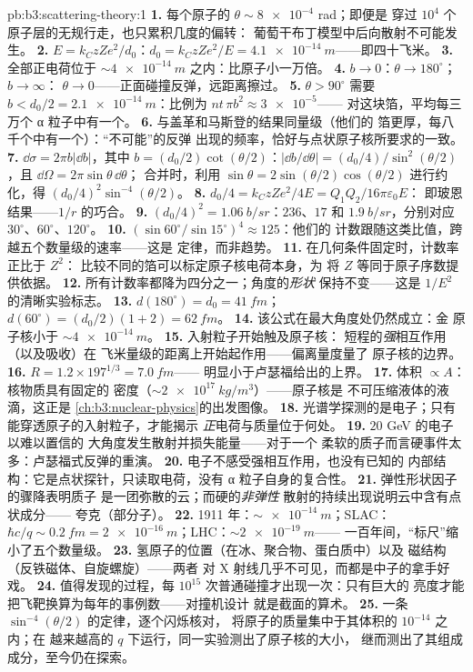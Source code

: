 \begin{solution}{pb:b3:scattering-theory:1}
\textbf{1.} 每个原子的 $\theta \sim \num{8e-4}$ rad；即便是
穿过 $10^4$ 个原子层的无规行走，也只累积几度的偏转：
葡萄干布丁模型中后向散射不可能发生。
\textbf{2.} $E = k_CzZe^2/d_0$：$d_0 = k_CzZe^2/E =
\qty{4.1e-14}{m}$——即四十飞米。
\textbf{3.} 全部正电荷位于
$\sim\qty{4e-14}{m}$ 之内：比原子小一万倍。
\textbf{4.} $b \to 0$：$\theta \to 180^\circ$；$b \to \infty$：
$\theta \to 0$——正面碰撞反弹，远距离擦过。
\textbf{5.} $\theta > 90^\circ$ 需要 $b < d_0/2 =
\qty{2.1e-14}{m}$：比例为 $nt\,\pi b^2 \approx \num{3e-5}$——
对这块箔，平均每三万个 α 粒子中有一个。
\textbf{6.} 与盖革和马斯登的结果同量级（他们的
箔更厚，每八千个中有一个）：“不可能”的反弹
出现的频率，恰好与点状原子核所要求的一致。
\textbf{7.} $\dd\sigma = 2\pi b|\dd b|$，其中 $b =
(d_0/2)\cot(\theta/2)$：$|\dd b/\dd\theta| = (d_0/4)/\sin^2(
\theta/2)$，且 $\dd\Omega = 2\pi\sin\theta\,\dd\theta$；
合并时，利用 $\sin\theta = 2\sin(\theta/2)\cos(\theta/2)$
进行约化，得 $(d_0/4)^2\sin^{-4}(\theta/2)$。
\textbf{8.} $d_0/4 = k_CzZe^2/4E = Q_1Q_2/16\pi\varepsilon_0E$：
即玻恩结果——$1/r$ 的巧合。
\textbf{9.} $(d_0/4)^2 = \qty{1.06}{b/sr}$：$236$、$17$ 和
$\qty{1.9}{b/sr}$，分别对应 $30^\circ$、$60^\circ$、$120^\circ$。
\textbf{10.} $(\sin60^\circ/\sin15^\circ)^4 \approx 125$：他们的
计数跟随这类比值，跨越五个数量级的速率——这是
定律，而非趋势。
\textbf{11.} 在几何条件固定时，计数率正比于 $Z^2$：
比较不同的箔可以标定原子核电荷本身，为
将 $Z$ 等同于原子序数提供依据。
\textbf{12.} 所有计数率都降为四分之一；角度的\emph{形状}
保持不变——这是 $1/E^2$ 的清晰实验标志。
\textbf{13.} $d(180^\circ) = d_0 = \qty{41}{fm}$；$d(60^\circ) =
(d_0/2)(1 + 2) = \qty{62}{fm}$。
\textbf{14.} 该公式在最大角度处仍然成立：金
原子核小于 $\sim\qty{4e-14}{m}$。
\textbf{15.} 入射粒子开始触及原子核：
短程的\emph{强}相互作用（以及吸收）在
飞米量级的距离上开始起作用——偏离量度量了
原子核的边界。
\textbf{16.} $R = 1.2 \times 197^{1/3} = \qty{7.0}{fm}$——
明显小于卢瑟福给出的上界。
\textbf{17.} 体积 $\propto A$：核物质具有固定的
密度（$\sim\qty{2e17}{kg/m^3}$）——原子核是
不可压缩液体的液滴，这正是
\cref{ch:b3:nuclear-physics}的出发图像。
\textbf{18.} 光谱学探测的是电子；只有
能穿透原子的入射粒子，才能揭示
\emph{正}电荷与质量位于何处。
\textbf{19.} $20$ GeV 的电子以难以置信的
大角度发生散射并损失能量——对于一个
柔软的质子而言硬事件太多：卢瑟福式反弹的重演。
\textbf{20.} 电子不感受强相互作用，也没有已知的
内部结构：它是点状探针，只读取电荷，没有
α 粒子自身的复合性。
\textbf{21.} 弹性形状因子的骤降表明质子
是一团弥散的云；而硬的\emph{非弹性}
散射的持续出现说明云中含有点状成分——
夸克（部分子）。
\textbf{22.} 1911 年：$\sim\qty{e-14}{m}$；SLAC：$\hbar c/q \sim
\qty{0.2}{fm} = \qty{2e-16}{m}$；LHC：$\sim\qty{2e-19}{m}$——
一百年间，“标尺”缩小了五个数量级。
\textbf{23.} 氢原子的位置（在冰、聚合物、蛋白质中）以及
磁结构（反铁磁体、自旋螺旋）——两者
对 X 射线几乎不可见，而都是中子的拿手好戏。
\textbf{24.} 值得发现的过程，每
$10^{15}$ 次普通碰撞才出现一次：只有巨大的
亮度才能把飞靶换算为每年的事例数——对撞机设计
就是截面的算术。
\textbf{25.} 一条 $\sin^{-4}(\theta/2)$ 的定律，逐个闪烁核对，
将原子的质量集中于其体积的 $10^{-14}$ 之内；在
越来越高的 $q$ 下运行，同一实验测出了原子核的大小，
继而测出了其组成成分，至今仍在探索。
\end{solution}

